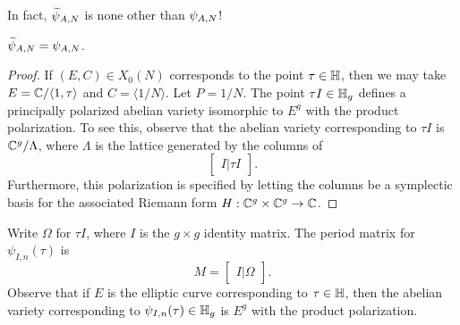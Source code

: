 \documentclass{amsart}
\begin{document}
In fact, $\widetilde{\psi}_{A,N}$ is none other than $\psi_{A,N}$!
\begin{proposition}
  $\widetilde{\psi}_{A,N} = \psi_{A,N}$.
\end{proposition}

\begin{proof}
  If $(E, C) \in X_0(N)$ corresponds to the point $\tau \in \mathbb{H}$, then we may take $E = \mathbb{C}/\langle 1, \tau \rangle$ and $C = \langle 1/N \rangle$. Let $P = 1/N$. The point $\tau I \in \mathbb{H}_g$ defines a principally polarized abelian variety isomorphic to $E^g$ with the product polarization. To see this, observe that the abelian variety corresponding to $\tau I$ is $\mathbb{C}^g/\Lambda$, where $\Lambda$ is the lattice generated by the columns of
  \[
    \begin{bmatrix}
      I | \tau I
    \end{bmatrix}.
  \]
  Furthermore, this polarization is specified by letting the columns be a symplectic basis for the associated Riemann form $H: \mathbb{C}^g \times \mathbb{C}^g \to \mathbb{C}$.

  
\end{proof}
Write $\Omega$ for $\tau I$, where $I$ is the $g \times g$ identity matrix. The period matrix for $\psi_{I,n}(\tau)$ is
\[
  M = \begin{bmatrix}
    I | \Omega
  \end{bmatrix}.
\]
Observe that if $E$ is the elliptic curve corresponding to $\tau \in \mathbb{H}$, then the abelian variety corresponding to $\psi_{I,n}(\tau) \in \mathbb{H}_g$ is $E^g$ with the product polarization.
\end{document}
